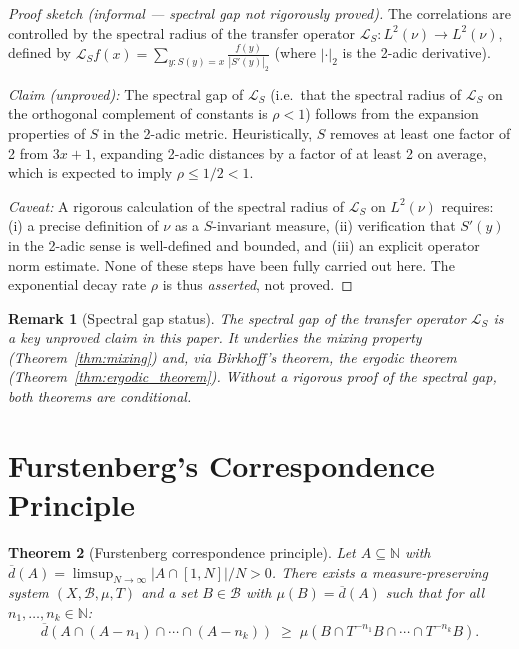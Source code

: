 \documentclass[12pt,a4paper]{article}
\newtheorem{theorem}{Theorem}[section]
\newtheorem{remark}[theorem]{Remark}
\begin{document}
\begin{proof}[Proof sketch (informal — spectral gap not rigorously proved)]
The correlations are controlled by the spectral radius of the transfer operator
$\mathcal{L}_S\colon L^2(\nu) \to L^2(\nu)$, defined by
$\mathcal{L}_S f(x) = \sum_{y: S(y)=x} \frac{f(y)}{|S'(y)|_2}$
(where $|\cdot|_2$ is the 2-adic derivative).

\emph{Claim (unproved):} The spectral gap of $\mathcal{L}_S$ (i.e.\ that the
spectral radius of $\mathcal{L}_S$ on the orthogonal complement of constants is
$\rho < 1$) follows from the expansion properties of $S$ in the 2-adic metric.
Heuristically, $S$ removes at least one factor of 2 from $3x+1$, expanding
2-adic distances by a factor of at least 2 on average, which is expected to imply
$\rho \leq 1/2 < 1$.

\emph{Caveat:} A rigorous calculation of the spectral radius of $\mathcal{L}_S$
on $L^2(\nu)$ requires: (i) a precise definition of $\nu$ as a $S$-invariant measure,
(ii) verification that $S'(y)$ in the 2-adic sense is well-defined and bounded, and
(iii) an explicit operator norm estimate.  None of these steps have been fully
carried out here. The exponential decay rate $\rho$ is thus \emph{asserted}, not proved.
\end{proof}

\begin{remark}[Spectral gap status]\label{rem:spectral_gap}
The spectral gap of the transfer operator $\mathcal{L}_S$ is a key unproved claim
in this paper.  It underlies the mixing property (Theorem~\ref{thm:mixing}) and,
via Birkhoff's theorem, the ergodic theorem (Theorem~\ref{thm:ergodic_theorem}).
Without a rigorous proof of the spectral gap, both theorems are conditional.
\end{remark}

\section{Furstenberg's Correspondence Principle}

\begin{theorem}[Furstenberg correspondence principle]\label{thm:furstenberg}
Let $A \subseteq \mathbb{N}$ with $\overline{d}(A) = \limsup_{N\to\infty} |A \cap [1,N]|/N > 0$.
There exists a measure-preserving system $(X, \mathcal{B}, \mu, T)$ and a set
$B \in \mathcal{B}$ with $\mu(B) = \overline{d}(A)$ such that for all
$n_1, \ldots, n_k \in \mathbb{N}$:
\[
  \overline{d}(A \cap (A - n_1) \cap \cdots \cap (A - n_k)) \;\geq\;
  \mu(B \cap T^{-n_1}B \cap \cdots \cap T^{-n_k}B).
\]
\end{theorem}
\end{document}
